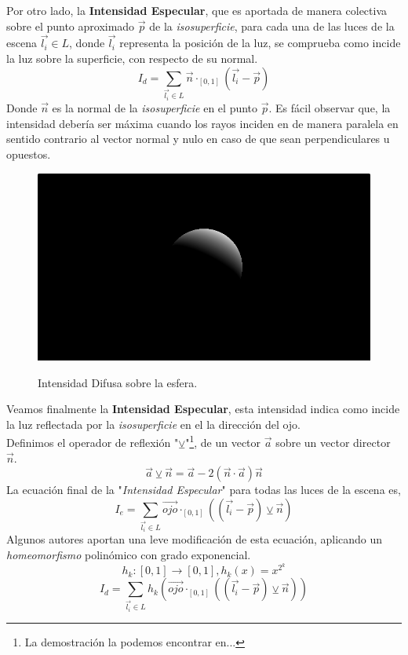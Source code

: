 Por otro lado, la \textbf{Intensidad Especular}, que es aportada de manera colectiva sobre el punto aproximado \(\Vec{p}\) de la \textit{isosuperficie}, para cada una de las luces de la escena \(\Vec{l_i}\in L\), donde \(\Vec{l_i}\) representa la posición de la luz, se comprueba como incide la luz sobre la superficie, con respecto de su normal. 
\[I_d = \sum_{\Vec{l_i}\in L} \Vec{n}\cdot_{[0, 1]}(\Vec{l_i}-\Vec{p})\]
Donde \(\Vec{n}\) es la normal de la \textit{isosuperficie} en el punto \(\Vec{p}\). Es fácil observar que, la intensidad debería ser máxima cuando los rayos inciden en de manera paralela en sentido contrario al vector normal y nulo en caso de que sean perpendiculares u opuestos.
\begin{figure}[H]
  \centering
  \captionsetup{justification=centering}%
  \includegraphics[width=1.0\textwidth]{secciones/imagenes/lightmodel/difusa.png}\label{fig:difusse}
  \caption{Intensidad Difusa sobre la esfera.}
\end{figure}
Veamos finalmente la \textbf{Intensidad Especular}, esta intensidad indica como incide la luz reflectada  por la \textit{isosuperficie} en el la dirección del ojo.\\
Definimos el operador de reflexión "\(\veebar\)"\footnote{La demostración la podemos encontrar en...}, de un vector \(\Vec{a}\) sobre un vector director \(\Vec{n}\).
\[\Vec{a}\veebar\Vec{n}=\Vec{a} - 2(\Vec{n} \cdot \Vec{a})\Vec{n}\]
La ecuación final de la "\textit{Intensidad Especular}" para todas las luces de la escena es,
\[I_e = \sum_{\Vec{l_i}\in L} \Vec{ojo}\cdot_{[0, 1]}\left(\left(\Vec{l_i}-\Vec{p}\right) \veebar \Vec{n}\right)\]
Algunos autores aportan una leve modificación de esta ecuación, aplicando un \textit{homeomorfismo} polinómico con grado exponencial.
\[h_k:[0,1]\longrightarrow[0,1] , h_k(x)=x^{2^k}\]
\[I_d = \sum_{\Vec{l_i}\in L} h_k\left(\Vec{ojo}\cdot_{[0, 1]}\left(\left(\Vec{l_i}-\Vec{p}\right) \veebar \Vec{n}\right)\right)\]
